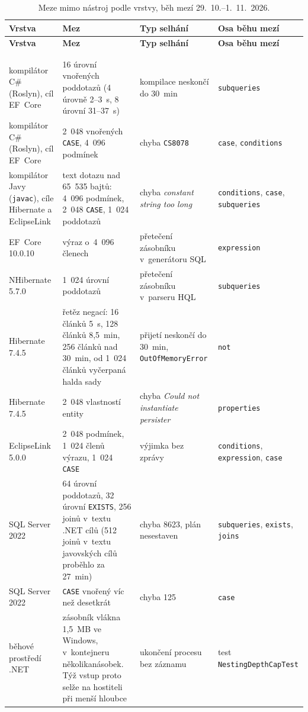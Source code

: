 {\footnotesize
\begin{longtable}{P{0.20} P{0.38} P{0.26} P{0.16}}
\toprule
\textbf{Vrstva} & \textbf{Mez} & \textbf{Typ selhání} & \textbf{Osa běhu mezí} \\
\midrule
\endfirsthead
\toprule
\textbf{Vrstva} & \textbf{Mez} & \textbf{Typ selhání} & \textbf{Osa běhu mezí} \\
\midrule
\endhead
\rule{0pt}{26pt}\\
\endfoot
\bottomrule
\caption{Meze mimo nástroj podle vrstvy, běh mezí 29.~10.--1.~11.~2026.}\label{tab:vrstvy}\\
\endlastfoot
kompilátor C\# (Roslyn), cíl EF~Core & 16 úrovní vnořených poddotazů (4 úrovně 2--3~s, 8 úrovní 31--37~s) & kompilace neskončí do 30~min & \texttt{subqueries} \\
kompilátor C\# (Roslyn), cíl EF~Core & 2~048 vnořených \texttt{CASE}, 4~096 podmínek & chyba \texttt{CS8078} & \texttt{case}, \texttt{conditions} \\
kompilátor Javy (\texttt{javac}), cíle Hibernate a EclipseLink & text dotazu nad 65~535 bajtů: 4~096 podmínek, 2~048 \texttt{CASE}, 1~024 poddotazů & chyba \emph{constant string too long} & \texttt{conditions}, \texttt{case}, \texttt{subqueries} \\
EF~Core 10.0.10 & výraz o~4~096 členech & přetečení zásobníku v~generátoru SQL & \texttt{expression} \\
NHibernate 5.7.0 & 1~024 úrovní poddotazů & přetečení zásobníku v~parseru HQL & \texttt{subqueries} \\
Hibernate 7.4.5 & řetěz negací: 16 článků 5~s, 128 článků 8,5~min, 256 článků nad 30~min, od 1~024 článků vyčerpaná halda sady & přijetí neskončí do 30~min, \texttt{OutOfMemoryError} & \texttt{not} \\
Hibernate 7.4.5 & 2~048 vlastností entity & chyba \emph{Could not instantiate persister} & \texttt{properties} \\
EclipseLink 5.0.0 & 2~048 podmínek, 1~024 členů výrazu, 1~024 \texttt{CASE} & výjimka bez zprávy & \texttt{conditions}, \texttt{expression}, \texttt{case} \\
SQL Server 2022 & 64 úrovní poddotazů, 32 úrovní \texttt{EXISTS}, 256 joinů v~textu .NET cílů (512 joinů v~textu javovských cílů proběhlo za 27~min) & chyba 8623, plán nesestaven & \texttt{subqueries}, \texttt{exists}, \texttt{joins} \\
SQL Server 2022 & \texttt{CASE} vnořený víc než desetkrát & chyba 125 & \texttt{case} \\
běhové prostředí .NET & zásobník vlákna 1,5~MB ve Windows, v~kontejneru několikanásobek. Týž vstup proto selže na hostiteli při menší hloubce & ukončení procesu bez záznamu & test \texttt{Nesting\-Depth\-CapTest} \\
\end{longtable}}


